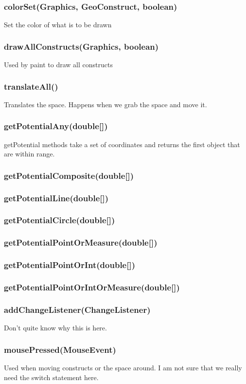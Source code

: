 \documentclass[a4paper,10pt]{report}
\begin{document}
\subsubsection{colorSet(Graphics, GeoConstruct, boolean)} Set the color of what is to be drawn
\subsubsection{drawAllConstructs(Graphics, boolean)} Used by paint to draw all constructs
\subsubsection{translateAll()} Translates the space. Happens when we grab the space and move it.
\subsubsection{getPotentialAny(double[])}  getPotential methods take a set of coordinates and returns the first object that are within range.
\subsubsection{getPotentialComposite(double[])}
\subsubsection{getPotentialLine(double[])}
\subsubsection{getPotentialCircle(double[])}
\subsubsection{getPotentialPointOrMeasure(double[])}
\subsubsection{getPotentialPointOrInt(double[])}
\subsubsection{getPotentialPointOrIntOrMeasure(double[])}
\subsubsection{addChangeListener(ChangeListener)} Don't quite know why this is here.
\subsubsection{mousePressed(MouseEvent)} Used when moving constructs or the space around.  I am not sure that we really need the switch statement here.
\end{document}
